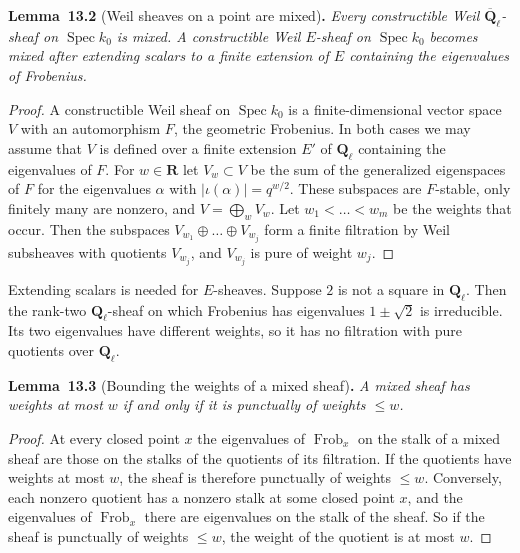 \documentclass[11pt]{article}
\newenvironment{bpstatement}[2]{\par\addvspace{0.6\baselineskip}\noindent\textbf{#1}#2\textbf{.}\enspace\ignorespaces}
  {\par\addvspace{0.4\baselineskip}}
\newenvironment{bpstatementit}[2]{\begin{bpstatement}{#1}{#2}\itshape\ignorespaces}{\end{bpstatement}}
\begin{document}
\label{bp11}%
\begin{bpstatementit}{Lemma~13.2}{ (Weil sheaves on a point are mixed)}
Every constructible Weil \(\overline{\mathbf Q}_\ell\)-sheaf on \(\operatorname{Spec}k_0\) is mixed. A constructible Weil \(E\)-sheaf on \(\operatorname{Spec}k_0\) becomes mixed after extending scalars to a finite extension of \(E\) containing the eigenvalues of Frobenius.
\end{bpstatementit}

\begin{proof}[{Proof}]\label{bp12}%
A constructible Weil sheaf on \(\operatorname{Spec}k_0\) is a finite-dimensional vector space \(V\) with an automorphism \(F\), the geometric Frobenius. In both cases we may assume that \(V\) is defined over a finite extension \(E'\) of \(\mathbf Q_\ell\) containing the eigenvalues of \(F\). For \(w\in\mathbf R\) let \(V_w\subset V\) be the sum of the generalized eigenspaces of \(F\) for the eigenvalues \(\alpha\) with \(|\iota(\alpha)|=q^{w/2}\). These subspaces are \(F\)-stable, only finitely many are nonzero, and \(V=\bigoplus_wV_w\). Let \(w_1<\dots<w_m\) be the weights that occur. Then the subspaces \(V_{w_1}\oplus\dots\oplus V_{w_j}\) form a finite filtration by Weil subsheaves with quotients \(V_{w_j}\), and \(V_{w_j}\) is pure of weight \(w_j\).
\end{proof}

\label{bp13}%
Extending scalars is needed for \(E\)-sheaves. Suppose \(2\) is not a square in \(\mathbf Q_\ell\). Then the rank-two \(\mathbf Q_\ell\)-sheaf on which Frobenius has eigenvalues \(1\pm\sqrt2\) is irreducible. Its two eigenvalues have different weights, so it has no filtration with pure quotients over \(\mathbf Q_\ell\).

\label{bp14}%
\begin{bpstatementit}{Lemma~13.3}{ (Bounding the weights of a mixed sheaf)}
A mixed sheaf has weights at most \(w\) if and only if it is punctually of weights \(\le w\).
\end{bpstatementit}

\begin{proof}[{Proof}]\label{bp15}%
At every closed point \(x\) the eigenvalues of \(\operatorname{Frob}_x\) on the stalk of a mixed sheaf are those on the stalks of the quotients of its filtration. If the quotients have weights at most \(w\), the sheaf is therefore punctually of weights \(\le w\). Conversely, each nonzero quotient has a nonzero stalk at some closed point \(x\), and the eigenvalues of \(\operatorname{Frob}_x\) there are eigenvalues on the stalk of the sheaf. So if the sheaf is punctually of weights \(\le w\), the weight of the quotient is at most \(w\).
\end{proof}
\end{document}
